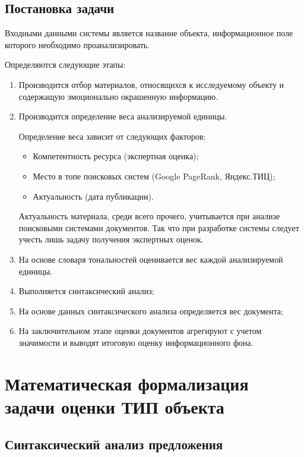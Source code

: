 \documentclass[a4paper,14pt,russian]{extreport}
\begin{document}
\section{Постановка задачи}

Входными данными системы является название объекта, информационное поле которого необходимо проанализировать.

Определяются следующие этапы:

\begin{enumerate}
\item Производится отбор материалов, относящихся к исследуемому объекту и содержащую эмоционально окрашенную информацию.
\item Производится определение веса анализируемой единицы.

Определение веса зависит от следующих факторов:

\begin{itemize}
\item Компетентность ресурса (экспертная оценка);
\item Место в топе поисковых систем (Google PageRank, Яндекс.ТИЦ);
\item Актуальность (дата публикации).
\end{itemize}

Актуальность материала, среди всего прочего, учитывается при анализе поисковыми системами документов. Так что при разработке системы следует учесть лишь задачу получения экспертных оценок.

\item На основе словаря тональностей оценивается вес каждой анализируемой единицы.

\item Выполняется синтаксический анализ;

\item На основе данных синтаксического анализа определяется вес документа;

\item На заключительном этапе оценки документов агрегируют с учетом значимости и выводят итоговую оценку информационного фона.
\end{enumerate}
\newpage
\chapter{Математическая формализация задачи оценки ТИП объекта}
\section{Синтаксический анализ предложения}
\end{document}
